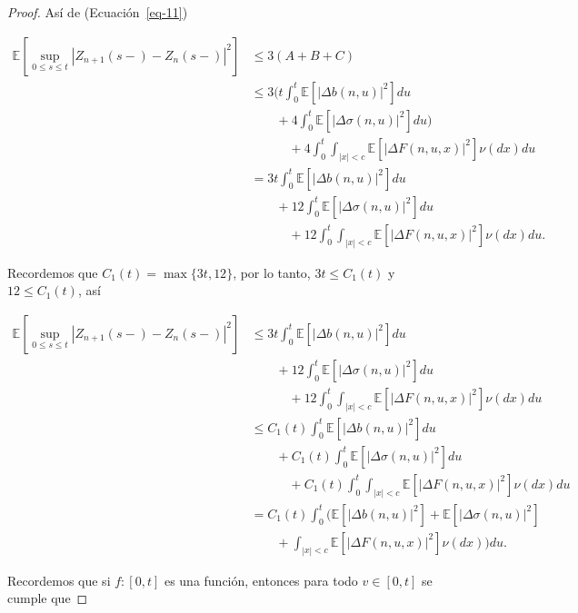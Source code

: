 \documentclass[
  spanish,
  us-letterpaper,
]{scrreprt}
\theoremstyle{plain}
\theoremstyle{plain}
\theoremstyle{plain}
\theoremstyle{definition}
\theoremstyle{remark}
\begin{document}
\begin{proof}
Así de (Ecuación~\ref{eq-11})

\[
    \begin{aligned}
        \mathbb{E}\left[\sup\limits_{0\leq s\leq t} \left|Z_{n+1}(s-)-Z_n(s-)\right|^2\right] & \leq 3(A+B+C)\\ 
        & \leq 3\Bigg(t\int_0^t \mathbb{E}\left[|\Delta b(n,u)|^2\right]du\\ 
        & \qquad + 4\int_0^t \mathbb{E}\left[|\Delta \sigma(n,u)|^2\right]du\Bigg)\\ 
        &  \qquad\quad + 4\int_0^t\int_{|x|<c}\mathbb{E}\left[|\Delta F(n,u,x)|^2\right]\nu(dx)du\\ 
        & = 3t\int_0^t \mathbb{E}\left[|\Delta b(n,u)|^2\right]du\\ 
        & \qquad + 12\int_0^t \mathbb{E}\left[|\Delta \sigma(n,u)|^2\right]du\\ 
        &  \qquad\quad + 12\int_0^t\int_{|x|<c}\mathbb{E}\left[|\Delta F(n,u,x)|^2\right]\nu(dx)du.
    \end{aligned}
\]

Recordemos que \(C_1(t)=\max\{3t,12\}\), por lo tanto, \(3t\leq C_1(t)\)
y \(12\leq C_1(t)\), así

\[
    \begin{aligned}
        \mathbb{E}\left[\sup\limits_{0\leq s\leq t} \left|Z_{n+1}(s-)-Z_n(s-)\right|^2\right] & \leq 3t\int_0^t \mathbb{E}\left[|\Delta b(n,u)|^2\right]du\\ 
        & \qquad + 12\int_0^t \mathbb{E}\left[|\Delta \sigma(n,u)|^2\right]du\\ 
        &  \qquad\quad + 12\int_0^t\int_{|x|<c}\mathbb{E}\left[|\Delta F(n,u,x)|^2\right]\nu(dx)du\\
        & \leq C_1(t)\int_0^t \mathbb{E}\left[|\Delta b(n,u)|^2\right]du\\ 
        & \qquad + C_1(t)\int_0^t \mathbb{E}\left[|\Delta \sigma(n,u)|^2\right]du\\ 
        &  \qquad\quad + C_1(t)\int_0^t\int_{|x|<c}\mathbb{E}\left[|\Delta F(n,u,x)|^2\right]\nu(dx)du\\
        & = C_1(t)\int_0^t\Bigg(\mathbb{E}\left[|\Delta b(n,u)|^2\right]+\mathbb{E}\left[|\Delta \sigma(n,u)|^2\right]\\ 
        & \qquad + \int_{|x|<c}\mathbb{E}\left[|\Delta F(n,u,x)|^2\right]\nu(dx)\Bigg)du.
    \end{aligned}
\]

Recordemos que si \(f:[0,t]\) es una función, entonces para todo
\(v\in [0,t]\) se cumple que


\end{proof}
\end{document}
